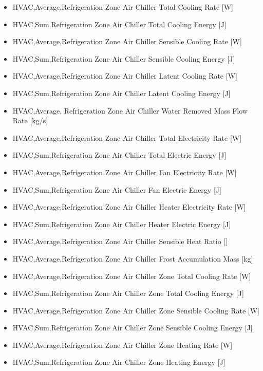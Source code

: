 \begin{itemize}
\item
  HVAC,Average,Refrigeration Zone Air Chiller Total Cooling Rate {[}W{]}
\item
  HVAC,Sum,Refrigeration Zone Air Chiller Total Cooling Energy {[}J{]}
\item
  HVAC,Average,Refrigeration Zone Air Chiller Sensible Cooling Rate {[}W{]}
\item
  HVAC,Sum,Refrigeration Zone Air Chiller Sensible Cooling Energy {[}J{]}
\item
  HVAC,Average,Refrigeration Zone Air Chiller Latent Cooling Rate {[}W{]}
\item
  HVAC,Sum,Refrigeration Zone Air Chiller Latent Cooling Energy {[}J{]}
\item
  HVAC,Average, Refrigeration Zone Air Chiller Water Removed Mass Flow Rate {[}kg/s{]}
\item
  HVAC,Average,Refrigeration Zone Air Chiller Total Electricity Rate {[}W{]}
\item
  HVAC,Sum,Refrigeration Zone Air Chiller Total Electric Energy {[}J{]}
\item
  HVAC,Average,Refrigeration Zone Air Chiller Fan Electricity Rate {[}W{]}
\item
  HVAC,Sum,Refrigeration Zone Air Chiller Fan Electric Energy {[}J{]}
\item
  HVAC,Average,Refrigeration Zone Air Chiller Heater Electricity Rate {[}W{]}
\item
  HVAC,Sum,Refrigeration Zone Air Chiller Heater Electric Energy {[}J{]}
\item
  HVAC,Average,Refrigeration Zone Air Chiller Sensible Heat Ratio {[]}
\item
  HVAC,Average,Refrigeration Zone Air Chiller Frost Accumulation Mass {[}kg{]}
\item
  HVAC,Average,Refrigeration Zone Air Chiller Zone Total Cooling Rate {[}W{]}
\item
  HVAC,Sum,Refrigeration Zone Air Chiller Zone Total Cooling Energy {[}J{]}
\item
  HVAC,Average,Refrigeration Zone Air Chiller Zone Sensible Cooling Rate {[}W{]}
\item
  HVAC,Sum,Refrigeration Zone Air Chiller Zone Sensible Cooling Energy {[}J{]}
\item
  HVAC,Average,Refrigeration Zone Air Chiller Zone Heating Rate {[}W{]}
\item
  HVAC,Sum,Refrigeration Zone Air Chiller Zone Heating Energy {[}J{]}
\end{itemize}


